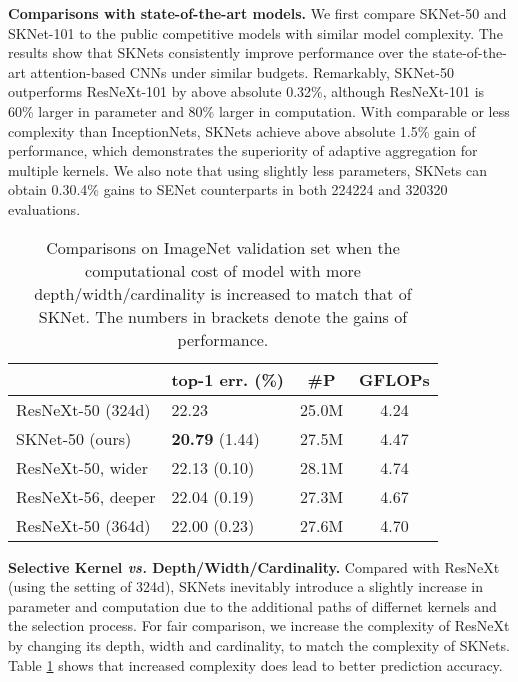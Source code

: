\documentclass[10pt,twocolumn,letterpaper]{article}
\begin{document}
	\vspace{6 pt}
	\noindent \textbf{Comparisons with state-of-the-art models.} We first compare SKNet-50 and SKNet-101 to the public competitive models with similar model complexity. The results show that SKNets consistently improve performance over the state-of-the-art attention-based CNNs under similar budgets. Remarkably, SKNet-50 outperforms ResNeXt-101 by above absolute 0.32\%, although ResNeXt-101 is 60\% larger in parameter and 80\% larger in computation. With comparable or less complexity than InceptionNets, SKNets achieve above absolute 1.5\% gain of performance, which demonstrates the superiority of adaptive aggregation for multiple kernels. We also note that using slightly less parameters, SKNets can obtain 0.30.4\% gains to SENet counterparts in both 224224 and 320320 evaluations. 
	
	\begin{table}
		\small
		\centering
		\renewcommand\arraystretch{1.1}
		\newcommand{\tabincell}[2]{\begin{tabular}{@{}#1@{}}#2\end{tabular}}
		\begin{tabular}{l|l|c|c}
			\hline
			&top-1 err. (\%) &  \#P & GFLOPs  \\
			\hline
			ResNeXt-50 (324d) &22.23 &25.0M&4.24  \\
			\hline
			SKNet-50 (ours)   &\textbf{20.79} {\scriptsize(1.44)} &27.5M&{4.47}  \\
			\hline
			ResNeXt-50, {wider}&22.13 {\scriptsize(0.10)}&28.1M&4.74\\
			ResNeXt-{56}, deeper&22.04 {\scriptsize(0.19)}&27.3M&4.67\\
			ResNeXt-50 ({36}4d)&22.00 {\scriptsize(0.23)}&27.6M&4.70\\
			\hline
		\end{tabular}
		\vspace{+4pt}
		\caption{Comparisons on ImageNet validation set when the computational cost of model with more depth/width/cardinality is increased to match that of SKNet. The numbers in brackets denote the gains of performance.}
		\label{tab_compare_DWC}
		\vspace{-8pt}
	\end{table}

	
	\vspace{6 pt}
	\noindent \textbf{Selective Kernel \emph{vs.} Depth/Width/Cardinality.} Compared with ResNeXt (using the setting of 324d), SKNets inevitably introduce a slightly increase in parameter and computation due to the additional paths of differnet kernels and the selection process. For fair comparison, we increase the complexity of ResNeXt by changing its depth, width and cardinality, to match the complexity of SKNets. Table \ref{tab_compare_DWC} shows that increased complexity does lead to better prediction accuracy.
	
\end{document}
